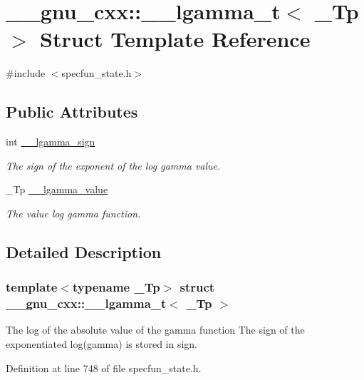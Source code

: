 \hypertarget{struct____gnu__cxx_1_1____lgamma__t}{}\section{\+\_\+\+\_\+gnu\+\_\+cxx\+:\+:\+\_\+\+\_\+lgamma\+\_\+t$<$ \+\_\+\+Tp $>$ Struct Template Reference}
\label{struct____gnu__cxx_1_1____lgamma__t}


{\ttfamily \#include $<$specfun\+\_\+state.\+h$>$}

\subsection*{Public Attributes}
\begin{DoxyCompactItemize}
\item 
int \hyperlink{struct____gnu__cxx_1_1____lgamma__t_a8aecdc9e5f69e729e96dc50f0c57b331}{\+\_\+\+\_\+lgamma\+\_\+sign}
\begin{DoxyCompactList}\small\item\em The sign of the exponent of the log gamma value. \end{DoxyCompactList}\item 
\+\_\+\+Tp \hyperlink{struct____gnu__cxx_1_1____lgamma__t_a916af5560acafd8dcf25c42fd28deef5}{\+\_\+\+\_\+lgamma\+\_\+value}
\begin{DoxyCompactList}\small\item\em The value log gamma function. \end{DoxyCompactList}\end{DoxyCompactItemize}


\subsection{Detailed Description}
\subsubsection*{template$<$typename \+\_\+\+Tp$>$\newline
struct \+\_\+\+\_\+gnu\+\_\+cxx\+::\+\_\+\+\_\+lgamma\+\_\+t$<$ \+\_\+\+Tp $>$}

The log of the absolute value of the gamma function The sign of the exponentiated log(gamma) is stored in sign. 

Definition at line 748 of file specfun\+\_\+state.\+h.



